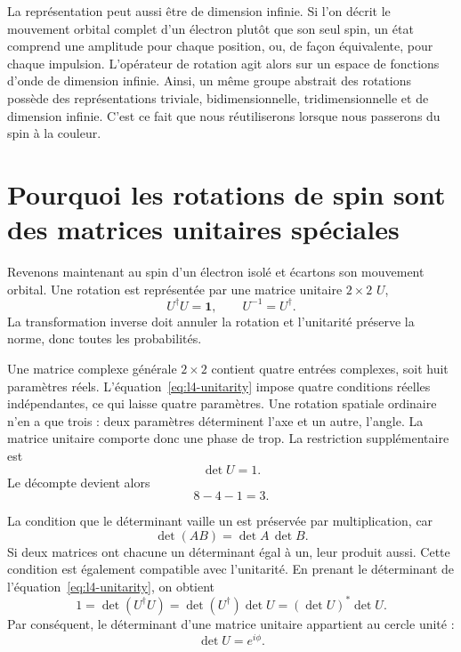 La représentation peut aussi être de dimension infinie. Si l’on décrit le mouvement orbital complet d’un électron plutôt que son seul spin, un état comprend une amplitude pour chaque position, ou, de façon équivalente, pour chaque impulsion. L’opérateur de rotation agit alors sur un espace de fonctions d’onde de dimension infinie. Ainsi, un même groupe abstrait des rotations possède des représentations triviale, bidimensionnelle, tridimensionnelle et de dimension infinie. C’est ce fait que nous réutiliserons lorsque nous passerons du spin à la couleur.

\section{Pourquoi les rotations de spin sont des matrices unitaires spéciales}

Revenons maintenant au spin d’un électron isolé et écartons son mouvement orbital. Une rotation est représentée par une matrice unitaire \(2\times2\) \(U\),
\begin{equation}
U^\dagger U=\boldsymbol 1,
\qquad
U^{-1}=U^\dagger.
\label{eq:l4-unitarity}
\end{equation}
La transformation inverse doit annuler la rotation et l’unitarité préserve la norme, donc toutes les probabilités.

Une matrice complexe générale \(2\times2\) contient quatre entrées complexes, soit huit paramètres réels. L’équation~\eqref{eq:l4-unitarity} impose quatre conditions réelles indépendantes, ce qui laisse quatre paramètres. Une rotation spatiale ordinaire n’en a que trois : deux paramètres déterminent l’axe et un autre, l’angle. La matrice unitaire comporte donc une phase de trop. La restriction supplémentaire est
\begin{equation}
\det U=1.
\label{eq:l4-det-one}
\end{equation}
Le décompte devient alors
\begin{equation}
8-4-1=3.
\end{equation}

La condition que le déterminant vaille un est préservée par multiplication, car
\begin{equation}
\det(AB)=\det A\,\det B.
\end{equation}
Si deux matrices ont chacune un déterminant égal à un, leur produit aussi. Cette condition est également compatible avec l’unitarité. En prenant le déterminant de l’équation~\eqref{eq:l4-unitarity}, on obtient
\begin{equation}
1=\det(U^\dagger U)
=\det(U^\dagger)\det U
=(\det U)^*\det U.
\end{equation}
Par conséquent, le déterminant d’une matrice unitaire appartient au cercle unité :
\begin{equation}
\det U=e^{i\phi}.
\end{equation}

